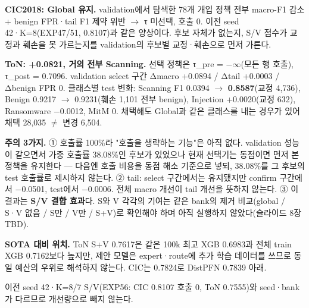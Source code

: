 \par\noindent \textbullet\enspace \textbf{CIC2018: Global 유지.} validation에서 탐색한 78개 개입 정책 전부 macro-F1 감소 +\allowbreak{} benign FPR·tail F1 제약 위반  \ensuremath{\rightarrow}  τ 미선택, 호출 0. 이전 seed 42·K=\allowbreak{}8(EXP47/\allowbreak{}51, 0.8107)과 같은 양상이다. 후보 자체가 없는지, S/\allowbreak{}V 점수가 교정과 훼손을 못 가르는지를 validation의 후보별 교정·훼손으로 먼저 가른다.


\par\noindent \textbullet\enspace \textbf{ToN: +\allowbreak{}0.0821, 거의 전부 Scanning.} 선택 정책은 τ\_\allowbreak{}pre =\allowbreak{} −\ensuremath{\infty}(모든 행 호출), τ\_\allowbreak{}post =\allowbreak{} 0.7096. validation select 구간 Δmacro +\allowbreak{}0.0894 /\allowbreak{} Δtail +\allowbreak{}0.0003 /\allowbreak{} Δbenign FPR 0. 클래스별 test 변화: Scanning F1 0.0394 \ensuremath{\rightarrow} \textbf{0.8587}(교정 4,736), Benign 0.9217 \ensuremath{\rightarrow} 0.9231(훼손 1,101 전부 benign), Injection +\allowbreak{}0.0020(교정 632), Ransomware −0.0012, MitM 0. 채택해도 Global과 같은 클래스를 내는 경우가 있어 채택 28,035 \ensuremath{\neq} 변경 6,504.


\par\noindent \textbullet\enspace \textbf{주의 3가지.} ① 호출률 100\%라 "호출을 생략하는 기능"은 아직 없다. validation 성능이 같으면서 가중 호출률 38.08\%인 후보가 있었으나 현재 선택기는 동점이면 먼저 본 정책을 유지한다 — 다음엔 호출 비용을 동점 해소 기준으로 넣되, 38.08\%를 그 후보의 test 호출률로 제시하지 않는다. ② tail: select 구간에서는 유지됐지만 confirm 구간에서 −0.0501, test에서 −0.0006. 전체 macro 개선이 tail 개선을 뜻하지 않는다. ③ 이 결과는 \textbf{S/\allowbreak{}V 결합 효과}다. S와 V 각각의 기여는 같은 bank의 제거 비교(global /\allowbreak{} S·V 없음 /\allowbreak{} S만 /\allowbreak{} V만 /\allowbreak{} S+\allowbreak{}V)로 확인해야 하며 아직 실행하지 않았다(슬라이드 8장 TBD).


\par\noindent \textbullet\enspace \textbf{SOTA 대비 위치.} ToN S+\allowbreak{}V 0.7617은 같은 100k 최고 XGB 0.6983과 전체 train XGB 0.7162보다 높지만, 제안 모델은 expert·route에 추가 학습 데이터를 쓰므로 동일 예산의 우위로 해석하지 않는다. CIC는 0.7824로 DistPFN 0.7839 아래.


\par\noindent \textbullet\enspace 이전 seed 42·K=\allowbreak{}8/\allowbreak{}7 S/\allowbreak{}V(EXP56: CIC 0.8107 호출 0, ToN 0.7555)와 seed·bank가 다르므로 개선량으로 빼지 않는다.


